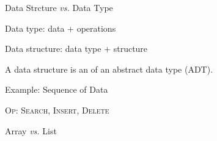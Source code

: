 \begin{frame}{Data Strcture \emph{vs.} Data Type}
  \centerline{Data type: data + operations}

  \pause
  \vspace{0.50cm}
  \centerline{Data structure: data type + structure}

  \pause
  \vspace{0.60cm}
  \centerline{A data structure is an  of an abstract data type (ADT).}

  \pause
  \vspace{0.80cm}
  \begin{exampleblock}{Example: Sequence of Data}
    \centerline{\textsc{Op: Search, Insert, Delete}}

    \vspace{0.20cm}
    \centerline{Array \emph{vs.} List}
  \end{exampleblock}
\end{frame}
